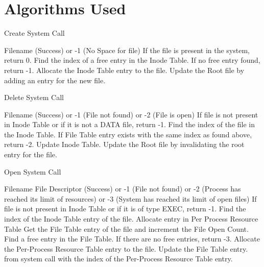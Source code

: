 \chapter{Algorithms Used}
\label{chap9}
\renewcommand{\algorithmicrequire}{\textbf{Input:}}
\renewcommand{\algorithmicensure}{\textbf{Output:}}

\begin{algorithm}
\caption{Create System Call}
\begin{algorithmic}
\REQUIRE Filename
 (Success) or -1 (No Space for file)
\STATE If the file is present in the system, return 0.   
\STATE Find the index of a free entry in the Inode Table. If no free entry found, return -1.  
\STATE Allocate the Inode Table entry to the file.
\STATE Update the Root file by adding an entry for the new file.  
\end{algorithmic}
\end{algorithm}


\begin{algorithm}
\caption{Delete System Call}
\begin{algorithmic}
\REQUIRE Filename
 (Success) or -1 (File not found) or -2 (File is open)
\STATE If file is not present in Inode Table or if it is not a DATA file, return -1.
\STATE Find the index of the file in the Inode Table.
\STATE If File Table entry exists with the same index as found above, return -2. 
\STATE Update Inode Table.
\STATE Update the Root file by invalidating the root entry for the file.
\end{algorithmic}
\end{algorithm}


\begin{algorithm}
\caption{Open System Call}
\begin{algorithmic}
\REQUIRE Filename
\ENSURE File Descriptor (Success) or -1 (File not found) or -2 (Process has reached its limit of resources) or -3 (System has reached its limit of open files)
\STATE If file is not present in Inode Table or if it is of type EXEC, return -1.
\STATE Find the index of the Inode Table entry of the file.
\STATE Allocate entry in Per Process Resource Table
    \STATE Get the File Table entry of the file and increment the File Open Count.
\ELSE
    \STATE Find a free entry in the File Table. If there are no free entries, return -3.
\ENDIF
\STATE Allocate the Per-Process Resource Table entry to the file.
\STATE Update the File Table entry.
\RETURN from system call with the index of the Per-Process Resource Table entry.
\end{algorithmic}
\end{algorithm}

